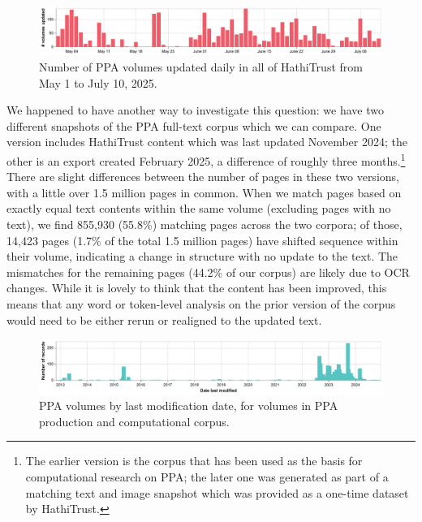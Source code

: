 \documentclass{anthology-ch}         %
\begin{document}
\begin{figure}[t!]
    \centering
    \includegraphics[width=1\linewidth]{figures/ppa_hathitrust_changes_countonly.pdf}
    \caption{Number of PPA volumes updated daily in all of HathiTrust from May 1 to July 10, 2025.}
    \label{fig:ppa-daily-updates}
\end{figure}

We happened to have another way to investigate this question: we have two different snapshots of the PPA full-text corpus which we can compare. One version includes HathiTrust content which was last updated November 2024; the other is an export created February 2025, a difference of roughly three months.\footnote{The earlier version is the corpus that has been used as the basis for computational research on PPA; the later one was generated as part of a matching text and image snapshot which was provided as a one-time dataset by HathiTrust.} There are slight differences between the number of pages in these two versions, with a little over 1.5 million pages in common. When we match pages based on exactly equal text contents within the same volume (excluding pages with no text), we find 855,930 (55.8\%) matching pages across the two corpora; of those, 14,423 pages (1.7\% of the total 1.5 million pages) have shifted sequence within their volume, indicating a change in structure with no update to the text. The mismatches for the remaining pages (44.2\% of our corpus) are likely due to OCR changes. While it is lovely to think that the content has been improved, this means that any word or token-level analysis on the prior version of the corpus would need to be either rerun or realigned to the updated text.

\begin{figure}[t!]
    \centering
    \includegraphics[width=1\linewidth]{figures/ppa_hathitrust_lastmodified.pdf}
    \caption{PPA volumes by last modification date, for volumes in PPA production and computational corpus.}
    \label{fig:ppa-last-modified}
\end{figure}
\end{document}
